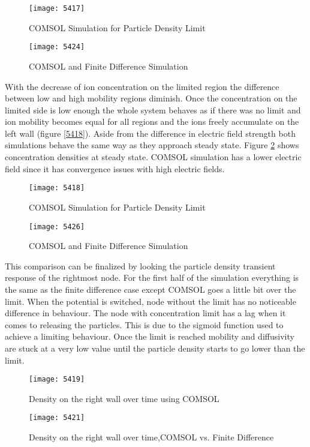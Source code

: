 \begin{figure}[ht]
\centering
\begin{minipage}[b]{0.45\linewidth}
\texttt{[image: 5417]}
\caption{COMSOL Simulation for Particle Density Limit}
\label{5417}
\end{minipage}
\quad
\begin{minipage}[b]{0.45\linewidth}
\texttt{[image: 5424]}
\caption{COMSOL and Finite Difference Simulation}
\label{5424}
\end{minipage}
\end{figure}

With the decrease of ion concentration on the limited region the difference between low and high mobility regions diminish. Once the concentration on the limited side is low enough the whole system behaves as if there was no limit and ion mobility becomes equal for all regions and the ions freely accumulate on the left wall (figure \ref{5418}). Aside from the difference in electric field strength both simulations behave the same way as they approach steady state. Figure \ref{5426} shows concentration densities at steady state. COMSOL simulation has a lower electric field since it has convergence issues with high electric fields. 

\begin{figure}[ht]
\centering
\begin{minipage}[b]{0.45\linewidth}
\texttt{[image: 5418]}
\caption{COMSOL Simulation for Particle Density Limit}
\label{5418}
\end{minipage}
\quad
\begin{minipage}[b]{0.45\linewidth}
\texttt{[image: 5426]}
\caption{COMSOL and Finite Difference Simulation}
\label{5426}
\end{minipage}
\end{figure}

This comparison can be finalized by looking the particle density transient response of the rightmost node. For the first half of the simulation everything is the same as the finite difference case except COMSOL goes a little bit over the limit. When the potential is switched, node without the limit has no noticeable difference in behaviour. The node with concentration limit has a lag when it comes to releasing the particles. This is due to the sigmoid function used to achieve a limiting behaviour. Once the limit is reached mobility and diffusivity are stuck at a very low value until the particle density starts to go lower than the limit.
\begin{figure}[ht]
\centering
\begin{minipage}[b]{0.45\linewidth}
\texttt{[image: 5419]}
\caption{Density on the right wall over time using COMSOL}
\label{5419}
\end{minipage}
\quad
\begin{minipage}[b]{0.45\linewidth}
\texttt{[image: 5421]}
\caption{Density on the right wall over time,COMSOL vs. Finite Difference}
\label{5421}
\end{minipage}
\end{figure}

